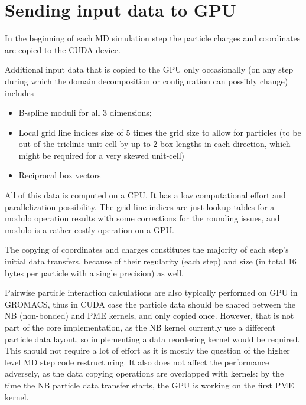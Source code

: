 \documentclass[12pt,a4paper]{report}
\begin{document}
\section{Sending input data to GPU}
In the beginning of each MD simulation step the particle charges and coordinates are copied to the CUDA device.

Additional input data that is copied to the GPU only occasionally (on any step during which the domain decomposition or configuration can possibly change) includes
\begin{itemize}
\item B-spline moduli for all 3 dimensions;
\item Local grid line indices size of 5 times the grid size to allow for particles (to be out of the triclinic unit-cell by up to 2 box lengths in each direction, which might be required for a very skewed unit-cell)
\item Reciprocal box vectors
\end{itemize}
All of this data is computed on a CPU. It has a low computational effort and parallelization possibility. The grid line indices are just lookup tables for a modulo operation results with some corrections for the rounding issues, and modulo is a rather costly operation on a GPU.

The copying of coordinates and charges constitutes the majority of each step's initial data transfers, because of their regularity (each step) and size (in total 16 bytes per particle with a single precision) as well.

Pairwise particle interaction calculations are also typically performed on GPU in GROMACS, thus in CUDA case the particle data should be shared between the NB (non-bonded) and PME kernels, and only copied once. However, that is not part of the core implementation, as the NB kernel currently use a different particle data layout, so implementing a data reordering kernel would be required. This should not require a lot of effort as it is mostly the question of the higher level MD step code restructuring. It also does not affect the performance adversely, as the data copying operations are overlapped with kernels: by the time the NB particle data transfer starts, the GPU is working on the first PME kernel.
\end{document}
